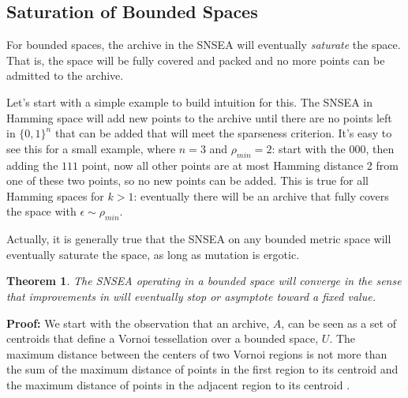 \documentclass[twoside]{article}
\newtheorem{theorem}{Theorem}
\begin{document}
\subsection{Saturation of Bounded Spaces}
\label{subsec:saturation}
For bounded spaces, the archive in the SNSEA will eventually \emph{saturate} the space.  That is, the space will be fully covered and packed and no more points can be admitted to the archive.  

Let's start with a simple example to build intuition for this.  The  SNSEA in Hamming space will add new points to the archive until there are no points left in $\{0,1\}^n$ that can be added that will meet the sparseness criterion.  It's easy to see this for a small example, where $n=3$ and $\rho_{min} = 2$:  start with the $000$, then adding the $111$ point, now all other points are at most Hamming distance 2 from one of these two points, so no new points can be added.  This is true for all Hamming spaces for $k>1$:  eventually there will be an archive that fully covers the space with $\epsilon \sim \rho_{min}$.

Actually, it is generally true that the SNSEA on any bounded metric space will eventually saturate the space, as long as mutation is ergotic.
\begin{theorem}
The SNSEA operating in a bounded space will converge in the sense that improvements in \emph{} will eventually stop or asymptote toward a fixed value.
\end{theorem}
\textbf{Proof:} We start with the observation that an archive, $A$, can be seen as a set of centroids that define a Vornoi tessellation \citep{Franz1991acmcs} over a bounded space, $U$.  The maximum distance between the centers of two Vornoi regions is not more than the sum of the maximum distance of points in the first region to its centroid and the maximum distance of points in the adjacent region to its centroid \citep{Franz1991acmcs}.  
\end{document}
